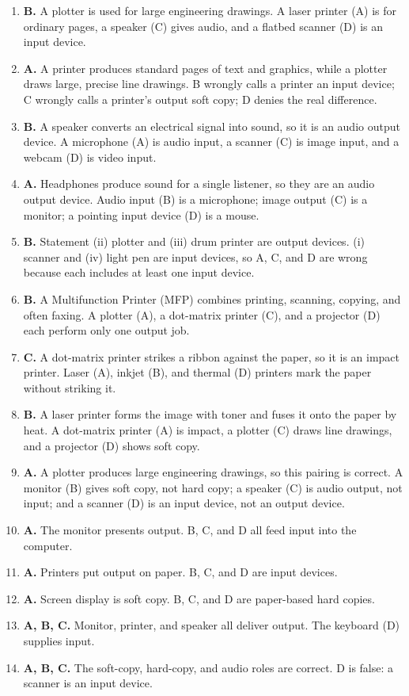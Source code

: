 \documentclass[11pt]{article}
\begin{document}
\begin{enumerate}[label=\textbf{Q\arabic*.}, leftmargin=*]
  copy. A monitor (A) shows the image on its own screen, a plotter (C) draws
  on paper, and a scanner (D) is an input device.
\item \textbf{B.} A plotter is used for large engineering drawings. A laser
  printer (A) is for ordinary pages, a speaker (C) gives audio, and a flatbed
  scanner (D) is an input device.
\item \textbf{A.} A printer produces standard pages of text and graphics,
  while a plotter draws large, precise line drawings. B wrongly calls a
  printer an input device; C wrongly calls a printer's output soft copy; D
  denies the real difference.
\item \textbf{B.} A speaker converts an electrical signal into sound, so it is
  an audio output device. A microphone (A) is audio input, a scanner (C) is
  image input, and a webcam (D) is video input.
\item \textbf{A.} Headphones produce sound for a single listener, so they are
  an audio output device. Audio input (B) is a microphone; image output (C) is
  a monitor; a pointing input device (D) is a mouse.
\item \textbf{B.} Statement (ii) plotter and (iii) drum printer are output
  devices. (i) scanner and (iv) light pen are input devices, so A, C, and D
  are wrong because each includes at least one input device.
\item \textbf{B.} A Multifunction Printer (MFP) combines printing, scanning,
  copying, and often faxing. A plotter (A), a dot-matrix printer (C), and a
  projector (D) each perform only one output job.
\item \textbf{C.} A dot-matrix printer strikes a ribbon against the paper, so
  it is an impact printer. Laser (A), inkjet (B), and thermal (D) printers
  mark the paper without striking it.
\item \textbf{B.} A laser printer forms the image with toner and fuses it onto
  the paper by heat. A dot-matrix printer (A) is impact, a plotter (C) draws
  line drawings, and a projector (D) shows soft copy.
\item \textbf{A.} A plotter produces large engineering drawings, so this
  pairing is correct. A monitor (B) gives soft copy, not hard copy; a speaker
  (C) is audio output, not input; and a scanner (D) is an input device, not an
  output device.

\item \textbf{A.} The monitor presents output. B, C, and D all feed input into the computer.
\item \textbf{A.} Printers put output on paper. B, C, and D are input devices.
\item \textbf{A.} Screen display is soft copy. B, C, and D are paper-based hard copies.
\item \textbf{A, B, C.} Monitor, printer, and speaker all deliver output. The keyboard (D) supplies input.
\item \textbf{A, B, C.} The soft-copy, hard-copy, and audio roles are correct. D is false: a scanner is an input device.
\end{enumerate}
\def\JKSSBLessonID{14}\def\JKSSBAnswers{1}
\end{document}
